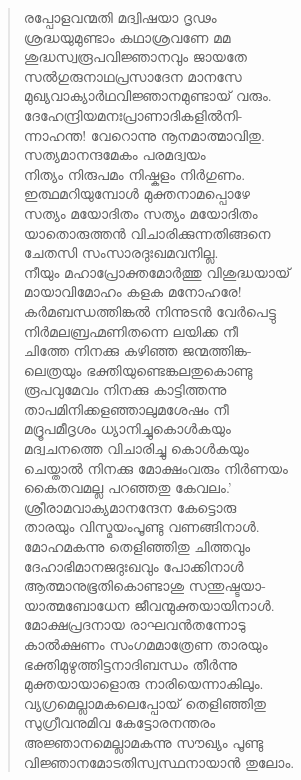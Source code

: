 \begin{verse}
രപ്പോളവന്മതി മദ്വിഷയാ ദൃഢം\\
ശ്രദ്ധയുമുണ്ടാം കഥാശ്രവണേ മമ\\
ശുദ്ധസ്വരൂപവിജ്ഞാനവും ജായതേ\\
സല്‍ഗുരുനാഥപ്രസാദേന മാനസേ\\
മുഖ്യവാക്യാര്‍ഥവിജ്ഞാനമുണ്ടായ് വരും.\\
ദേഹേന്ദ്രിയമനഃപ്രാണാദികളില്‍നി-\\
ന്നാഹന്ത! വേറൊന്നു നൂനമാത്മാവിതു.\\
സത്യമാനന്ദമേകം പരമദ്വയം\\
നിത്യം നിരുപമം നിഷ്കളം നിര്‍ഗുണം.\\
ഇത്ഥമറിയുമ്പോള്‍ മുക്തനാമപ്പൊഴേ\\
സത്യം മയോദിതം സത്യം മയോദിതം\\
യാതൊരുത്തന്‍ വിചാരിക്കുന്നതിങ്ങനെ\\
ചേതസി സംസാരദുഃഖമവനില്ല.\\
നീയും മഹാപ്രോക്തമോര്‍ത്തു വിശുദ്ധയായ്\\
മായാവിമോഹം കളക മനോഹരേ!\\
കര്‍മബന്ധത്തിങ്കല്‍ നിന്നുടന്‍ വേര്‍പെട്ടു\\
നിര്‍മലബ്രഹ്മണിതന്നെ ലയിക്ക നീ\\
ചിത്തേ നിനക്കു കഴിഞ്ഞ ജന്മത്തിങ്ക-\\
ലെത്രയും ഭക്തിയുണ്ടെങ്കലതുകൊണ്ടു\\
രൂപവുമേവം നിനക്കു കാട്ടിത്തന്നു\\
താപമിനിക്കളഞ്ഞാലുമശേഷം നീ\\
മദ്രൂപമീദൃശം ധ്യാനിച്ചുകൊള്‍കയും\\
മദ്വചനത്തെ വിചാരിച്ചു കൊള്‍കയും\\
ചെയ്താല്‍ നിനക്കു മോക്ഷംവരും നിര്‍ണയം\\
കൈതവമല്ല പറഞ്ഞതു കേവലം.’\\
ശ്രീരാമവാക്യമാനന്ദേന കേട്ടൊരു\\
താരയും വിസ്മയംപൂണ്ടു വണങ്ങിനാള്‍.\\
മോഹമകന്നു തെളിഞ്ഞിതു ചിത്തവും\\
ദേഹാഭിമാനജദുഃഖവും പോക്കിനാള്‍\\
ആത്മാനുഭൂതികൊണ്ടാശു സന്തുഷ്ടയാ-\\
യാത്മബോധേന ജീവന്മുക്തയായിനാള്‍.\\
മോക്ഷപ്രദനായ രാഘവന്‍തന്നോടു\\
കാല്‍ക്ഷണം സംഗമമാത്രേണ താരയും\\
ഭക്തിമുഴുത്തിട്ടനാദിബന്ധം തീര്‍ന്നു\\
മുക്തയായാളൊരു നാരിയെന്നാകിലും.\\
വ്യഗ്രമെല്ലാമകലെപ്പോയ് തെളിഞ്ഞിതു\\
സുഗ്രീവനുമിവ കേട്ടോരനന്തരം\\
അജ്ഞാനമെല്ലാമകന്നു സൗഖ്യം പൂണ്ടു\\
വിജ്ഞാനമോടതിസ്വസ്ഥനായാന്‍ തുലോം.
\end{verse}

